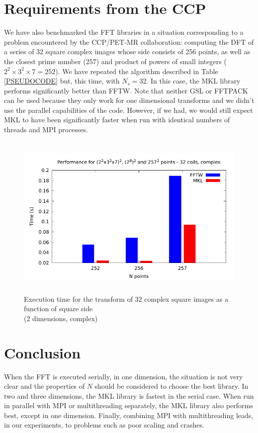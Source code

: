 \documentclass[12pt, a4paper]{article} \setlength{\textheight}{24cm}
\begin{document}
\section{Requirements from the CCP}\label{Sec:CCPPETMR}
We have also benchmarked the FFT libraries in a situation
corresponding to a problem encountered by the CCP/PET-MR
collaboration: computing the DFT of a series of 32 square complex
images whose side consists of 256 points, as well as the closest prime
number (257) and product of powers of small integers ($2^2\times
3^2\times 7=252$). We have repeated the algorithm described in Table
\ref{PSEUDOCODE} but, this time, with $N_s=32$. In this case, the MKL
library performs significantly better than FFTW. Note that neither GSL
or FFTPACK can be used because they only work for one dimensional
transforms and we didn't use the parallel capabilities of the
code. However, if we had, we would still expect MKL to have been
significantly faster when run with identical numbers of threads and
MPI processes.

\begin{figure}[htbp]
  \centering
  \includegraphics[height=8cm]{graphs/ccppetmr.pdf}
  \caption{Execution time for the transform of 32 complex square
    images as a function of square side\\(2 dimensions, complex)}
  \label{method}
\end{figure}

\section{Conclusion}
When the FFT is executed serially, in one dimension, the situation is
not very clear and the properties of $N$ should be considered to
choose the best library. In two and three dimensions, the MKL library
is fastest in the serial case. When run in parallel with MPI or multithreading
separately, the MKL library also performs best, except in one
dimension. Finally, combining MPI with multithreading leads, in our
experiments, to problems such as poor scaling and crashes.
\end{document}
